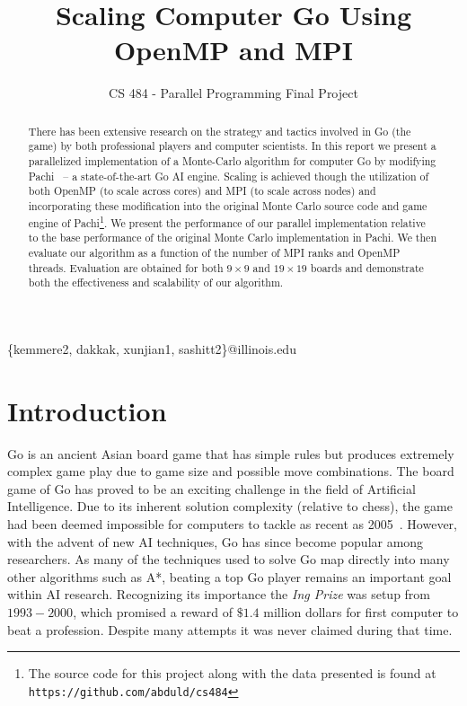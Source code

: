 \documentclass[nocopyrightspace, 10pt]{sigplanconf}
\begin{document}
\title{Scaling Computer Go Using OpenMP and MPI}
\subtitle{CS 484 - Parallel Programming Final Project}


           {}
           {\{kemmere2, dakkak, xunjian1, sashitt2\}@illinois.edu}


\maketitle

\begin{abstract}

There has been extensive research on the strategy and tactics involved in Go (the game) by both professional players and computer scientists. In this report we present a parallelized implementation of a Monte-Carlo algorithm for computer Go by modifying  Pachi~\cite{pachi} -- a state-of-the-art Go AI engine. Scaling is achieved though the utilization of both OpenMP (to scale across cores) and MPI (to scale across nodes) and incorporating these modification into the original Monte Carlo source code and game engine of Pachi\footnote{The source code for this project along with the data presented is found at \texttt{https://github.com/abduld/cs484}}. We present the performance of our parallel implementation relative to the base performance of the original Monte Carlo implementation in Pachi. We then evaluate our algorithm as a function of the number of MPI ranks and OpenMP threads. Evaluation are obtained for both $9 \times 9$ and $19 \times 19$ boards and demonstrate both the effectiveness and scalability of our algorithm.  


\end{abstract}

\section{Introduction}

Go is an ancient Asian board game that has simple rules but produces extremely complex game play due to game size and possible move combinations.  The board game of Go has proved to be an exciting challenge in the field of Artificial Intelligence. Due to its inherent solution complexity (relative to chess), the game had been deemed impossible for computers to tackle as recent as 2005~\cite{gohard}.  However, with the advent of new AI techniques, Go has since become popular among researchers. As many of the techniques used to solve Go map directly into many other algorithms such as A*, beating a top Go player remains an important goal within AI research. Recognizing its importance the \textit{Ing Prize} was setup from $1993-2000$, which promised a reward of $\$1.4$ million dollars for first computer to beat a profession. Despite many attempts it was never claimed during that time.
\end{document}
